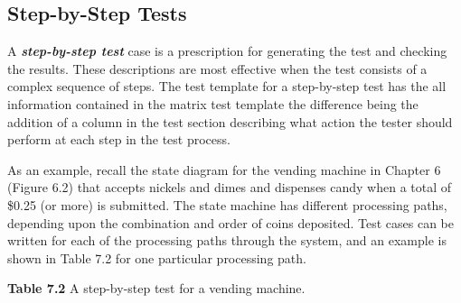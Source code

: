 \subsection*{Step-by-Step Tests}
\label{subsection:step-by-step-tests}

A \emph{\textbf{step-by-step test}} case is a prescription for
generating the test and checking the results. These descriptions are
most effective when the test consists of a complex sequence of steps.
The test template for a step-by-step test has the all information
contained in the matrix test template the difference being the addition
of a column in the test section describing what action the tester should
perform at each step in the test process.

As an example, recall the state diagram for the vending machine in
Chapter 6 (Figure 6.2) that accepts nickels and dimes and dispenses
candy when a total of \$0.25 (or more) is submitted. The state machine
has different processing paths, depending upon the combination and order
of coins deposited. Test cases can be written for each of the processing
paths through the system, and an example is shown in Table 7.2 for one
particular processing path.

\textbf{\hfill\break
Table 7.2} A step-by-step test for a vending machine.

